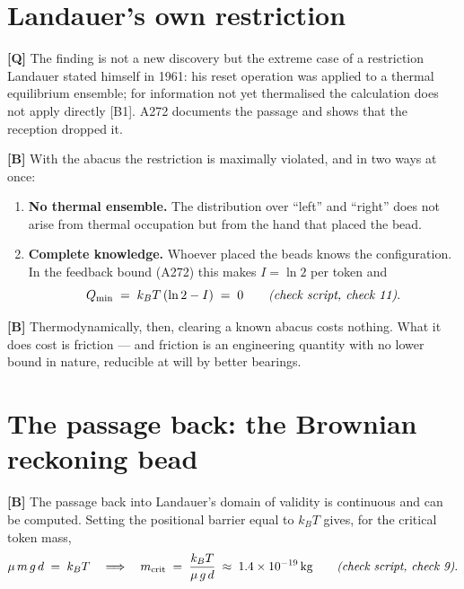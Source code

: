 \section{Landauer's own restriction}

\textbf{[Q]} The finding is not a new discovery but the extreme case of a restriction
Landauer stated himself in 1961: his reset operation was applied to a thermal
equilibrium ensemble; for information not yet thermalised the calculation does not
apply directly [B1]. A272 documents the passage and shows that the reception
dropped it.

\textbf{[B]} With the abacus the restriction is maximally violated, and in two ways at
once:

\begin{enumerate}[leftmargin=1.6em,itemsep=0.3em]
  \item \textbf{No thermal ensemble.} The distribution over “left” and “right”
        does not arise from thermal occupation but from the hand that placed the
        bead.
  \item \textbf{Complete knowledge.} Whoever placed the beads knows the
        configuration. In the feedback bound (A272) this makes $I = \ln 2$ per
        token and
        \begin{equation}
          Q_{\min} \;=\; k_B T\,(\ln 2 - I) \;=\; 0
          \qquad \text{\emph{(check script, check 11)}} .
        \end{equation}
\end{enumerate}

\textbf{[B]} Thermodynamically, then, clearing a known abacus costs nothing. What it does
cost is friction --- and friction is an engineering quantity with no lower bound
in nature, reducible at will by better bearings.

\section{The passage back: the Brownian reckoning bead}

\textbf{[B]} The passage back into Landauer's domain of validity is continuous and can be
computed. Setting the positional barrier equal to $k_BT$ gives, for the critical
token mass,
\begin{equation}
  \mu\,m\,g\,d \;=\; k_B T
  \quad\Longrightarrow\quad
  m_{\text{crit}} \;=\; \frac{k_B T}{\mu\,g\,d} \;\approx\; 1.4\times10^{-19}\,\text{kg}
  \qquad \text{\emph{(check script, check 9)}} .
\end{equation}

